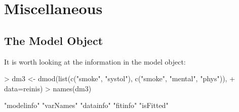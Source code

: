 \documentclass[12pt]{article}
\begin{document}











\section{Miscellaneous}
\label{sec:misc}





\subsection{The Model Object}
\label{sec:intomodel}


It is worth looking at the information in the model object:

\begin{Schunk}
\begin{Sinput}
> dm3 <- dmod(list(c("smoke", "systol"), c("smoke", "mental", "phys")),
+             data=reinis)
> names(dm3)
\end{Sinput}
\begin{Soutput}
[1] "modelinfo" "varNames"  "datainfo"  "fitinfo"   "isFitted" 
\end{Soutput}
\end{Schunk}
\end{document}
